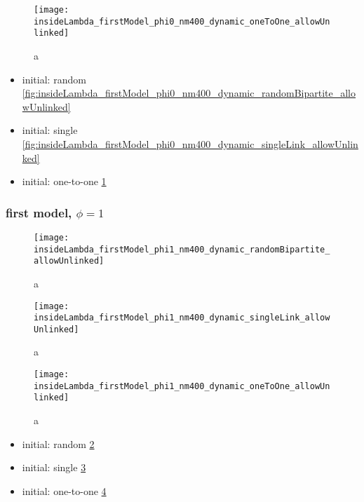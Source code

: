 \begin{figure}
  \centering
  \texttt{[image: insideLambda\_firstModel\_phi0\_nm400\_dynamic\_oneToOne\_allowUnlinked]}
  \caption{a}
  \label{fig:insideLambda_firstModel_phi0_nm400_dynamic_oneToOne_allowUnlinked}
\end{figure}

\begin{itemize}
\item initial: random \ref{fig:insideLambda_firstModel_phi0_nm400_dynamic_randomBipartite_allowUnlinked}
\item initial: single \ref{fig:insideLambda_firstModel_phi0_nm400_dynamic_singleLink_allowUnlinked}
\item initial: one-to-one \ref{fig:insideLambda_firstModel_phi0_nm400_dynamic_oneToOne_allowUnlinked}
\end{itemize}

\subsubsection{first model, $\phi=1$}

\begin{figure}
  \centering
  \texttt{[image: insideLambda\_firstModel\_phi1\_nm400\_dynamic\_randomBipartite\_allowUnlinked]}
  \caption{a}
  \label{fig:insideLambda_firstModel_phi1_nm400_dynamic_randomBipartite_allowUnlinked}
\end{figure}

\begin{figure}
  \centering
  \texttt{[image: insideLambda\_firstModel\_phi1\_nm400\_dynamic\_singleLink\_allowUnlinked]}
  \caption{a}
  \label{fig:insideLambda_firstModel_phi1_nm400_dynamic_singleLink_allowUnlinked}
\end{figure}

\begin{figure}
  \centering
  \texttt{[image: insideLambda\_firstModel\_phi1\_nm400\_dynamic\_oneToOne\_allowUnlinked]}
  \caption{a}
  \label{fig:insideLambda_firstModel_phi1_nm400_dynamic_oneToOne_allowUnlinked}
\end{figure}

\begin{itemize}
\item initial: random \ref{fig:insideLambda_firstModel_phi1_nm400_dynamic_randomBipartite_allowUnlinked}
\item initial: single \ref{fig:insideLambda_firstModel_phi1_nm400_dynamic_singleLink_allowUnlinked}
\item initial: one-to-one \ref{fig:insideLambda_firstModel_phi1_nm400_dynamic_oneToOne_allowUnlinked}
\end{itemize}

